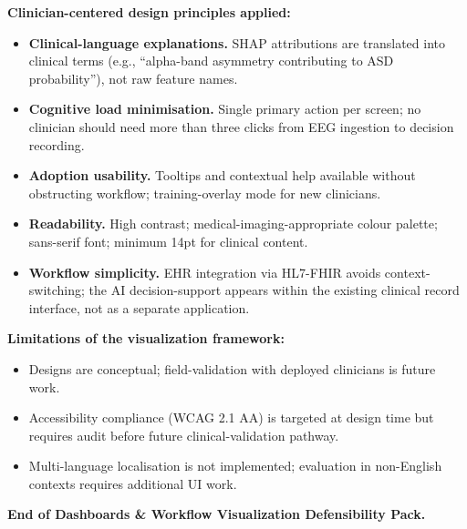 \noindent\textbf{Clinician-centered design principles applied:}
\begin{itemize}[leftmargin=*, itemsep=2pt]
    \item \textbf{Clinical-language explanations.} SHAP attributions are translated into clinical terms (e.g., ``alpha-band asymmetry contributing to ASD probability''), not raw feature names.
    \item \textbf{Cognitive load minimisation.} Single primary action per screen; no clinician should need more than three clicks from EEG ingestion to decision recording.
    \item \textbf{Adoption usability.} Tooltips and contextual help available without obstructing workflow; training-overlay mode for new clinicians.
    \item \textbf{Readability.} High contrast; medical-imaging-appropriate colour palette; sans-serif font; minimum 14pt for clinical content.
    \item \textbf{Workflow simplicity.} EHR integration via HL7-FHIR avoids context-switching; the AI decision-support appears within the existing clinical record interface, not as a separate application.
\end{itemize}

\noindent\textbf{Limitations of the visualization framework:}
\begin{itemize}[leftmargin=*, itemsep=2pt]
    \item Designs are conceptual; field-validation with deployed clinicians is future work.
    \item Accessibility compliance (WCAG 2.1 AA) is targeted at design time but requires audit before future clinical-validation pathway.
    \item Multi-language localisation is not implemented; evaluation in non-English contexts requires additional UI work.
\end{itemize}

\noindent\textbf{End of Dashboards \& Workflow Visualization Defensibility Pack.}

